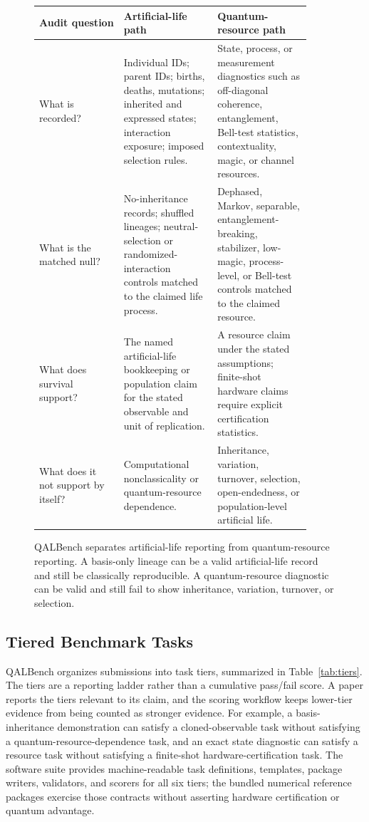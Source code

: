 \documentclass[11pt]{article}
\begin{document}
\begin{figure}[t]
\centering
\small
\setlength{\tabcolsep}{5pt}
\renewcommand{\arraystretch}{1.18}
\begin{tabular}{P{0.28\linewidth}P{0.31\linewidth}P{0.31\linewidth}}
\toprule
\textbf{Audit question} & \textbf{Artificial-life path} & \textbf{Quantum-resource path} \\
\midrule
What is recorded? & Individual IDs; parent IDs; births, deaths, mutations; inherited and expressed states; interaction exposure; imposed selection rules. & State, process, or measurement diagnostics such as off-diagonal coherence, entanglement, Bell-test statistics, contextuality, magic, or channel resources. \\
\addlinespace
What is the matched null? & No-inheritance records; shuffled lineages; neutral-selection or randomized-interaction controls matched to the claimed life process. & Dephased, Markov, separable, entanglement-breaking, stabilizer, low-magic, process-level, or Bell-test controls matched to the claimed resource. \\
\addlinespace
What does survival support? & The named artificial-life bookkeeping or population claim for the stated observable and unit of replication. & A resource claim under the stated assumptions; finite-shot hardware claims require explicit certification statistics. \\
\addlinespace
What does it not support by itself? & Computational nonclassicality or quantum-resource dependence. & Inheritance, variation, turnover, selection, open-endedness, or population-level artificial life. \\
\bottomrule
\end{tabular}
\caption{QALBench separates artificial-life reporting from quantum-resource reporting. A basis-only lineage can be a valid artificial-life record and still be classically reproducible. A quantum-resource diagnostic can be valid and still fail to show inheritance, variation, turnover, or selection.}
\label{fig:layers}
\end{figure}

\subsection{Tiered Benchmark Tasks}

QALBench organizes submissions into task tiers, summarized in Table~\ref{tab:tiers}. The tiers are a reporting ladder rather than a cumulative pass/fail score. A paper reports the tiers relevant to its claim, and the scoring workflow keeps lower-tier evidence from being counted as stronger evidence. For example, a basis-inheritance demonstration can satisfy a cloned-observable task without satisfying a quantum-resource-dependence task, and an exact state diagnostic can satisfy a resource task without satisfying a finite-shot hardware-certification task. The software suite provides machine-readable task definitions, templates, package writers, validators, and scorers for all six tiers; the bundled numerical reference packages exercise those contracts without asserting hardware certification or quantum advantage.
\end{document}

